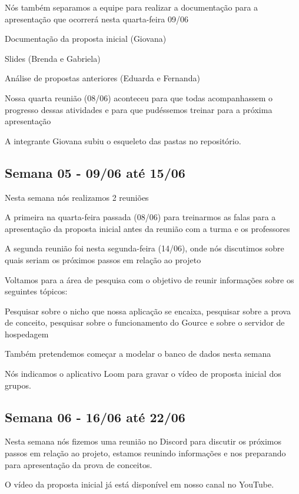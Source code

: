 \begin{apendicesenv}
\begin{flushleft}
Nós também separamos a equipe para realizar a documentação para a apresentação que ocorrerá nesta quarta-feira 09/06

Documentação da proposta inicial (Giovana)

Slides (Brenda e Gabriela)

Análise de propostas anteriores (Eduarda e Fernanda)

Nossa quarta reunião (08/06) aconteceu para que todas acompanhassem o progresso dessas atividades e para que pudéssemos treinar para a próxima apresentação

A integrante Giovana subiu o esqueleto das pastas no repositório.
\end{flushleft}
\begin{flushleft}
 \section{Semana 05 - 09/06 até 15/06}
  Nesta semana nós realizamos 2 reuniões 

A primeira na quarta-feira passada (08/06) para treinarmos as falas para a apresentação da proposta inicial antes da reunião com a turma e os professores

A segunda reunião foi nesta segunda-feira (14/06), onde nós discutimos sobre quais seriam os próximos passos em relação ao projeto

Voltamos para a área de pesquisa com o objetivo de reunir informações sobre os seguintes tópicos:

Pesquisar sobre o nicho que nossa aplicação se encaixa, pesquisar sobre a prova de conceito, pesquisar sobre o funcionamento do \gls{Gource} e sobre o servidor de hospedagem

Também pretendemos começar a modelar o banco de dados nesta semana

Nós indicamos o aplicativo \gls{Loom} para gravar o vídeo de proposta inicial dos grupos.
\end{flushleft}
\begin{flushleft}
 \section{Semana 06 - 16/06 até 22/06}
  Nesta semana nós fizemos uma reunião no \gls{Discord} para discutir os próximos passos em relação ao projeto, estamos reunindo informações e nos preparando para apresentação da prova de conceitos.

O vídeo da proposta inicial já está disponível em nosso canal no \gls{YouTube}.


\end{flushleft}
\end{apendicesenv}
